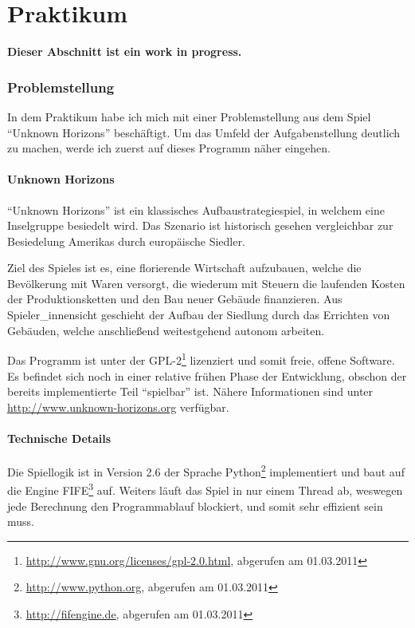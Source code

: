 \documentclass[%
			fontsize=12pt,%
			paper=a4,%
			DIV11,
			liststotoc,
			bibtotoc,
			draft=false,%
			titlepage
			]{scrartcl}
\newcommand{\footurl}[2]{\footnote{\url{#1}, abgerufen am #2}}
\begin{document}
\newpage
\part{Praktikum}

{\Huge \bf Dieser Abschnitt ist ein work in progress.}
\newpage

\section{Problemstellung}

In dem Praktikum habe ich mich mit einer Problemstellung aus dem Spiel "`Unknown Horizons"' beschäftigt.
Um das Umfeld der Aufgabenstellung deutlich zu machen, werde ich zuerst auf dieses Programm näher eingehen.

\subsection{Unknown Horizons}
"`Unknown Horizons"' ist ein klassisches Aufbaustrategiespiel, in welchem eine Inselgruppe besiedelt wird. 
Das Szenario ist historisch gesehen vergleichbar zur Besiedelung Amerikas durch europäische Siedler.

Ziel des Spieles ist es, eine florierende Wirtschaft aufzubauen, welche die Bevölkerung mit Waren versorgt, die wiederum mit Steuern die laufenden Kosten der Produktionsketten und den Bau neuer Gebäude finanzieren.
Aus Spieler\_innensicht geschieht der Aufbau der Siedlung durch das Errichten von Gebäuden, welche anschließend weitestgehend autonom arbeiten.

Das Programm ist unter der GPL-2\footurl{http://www.gnu.org/licenses/gpl-2.0.html}{01.03.2011} lizenziert und somit freie, offene Software. 
Es befindet sich noch in einer relative frühen Phase der Entwicklung, obschon der bereits implementierte Teil "`spielbar"' ist.
Nähere Informationen sind unter \url{http://www.unknown-horizons.org} verfügbar.

\subsection{Technische Details}

Die Spiellogik ist in Version 2.6 der Sprache Python\footurl{http://www.python.org}{01.03.2011} implementiert und
baut auf die Engine FIFE\footurl{http://fifengine.de}{01.03.2011} auf.
Weiters läuft das Spiel in nur einem Thread ab, weswegen jede Berechnung den Programmablauf blockiert, und somit sehr effizient sein muss.
\end{document}
